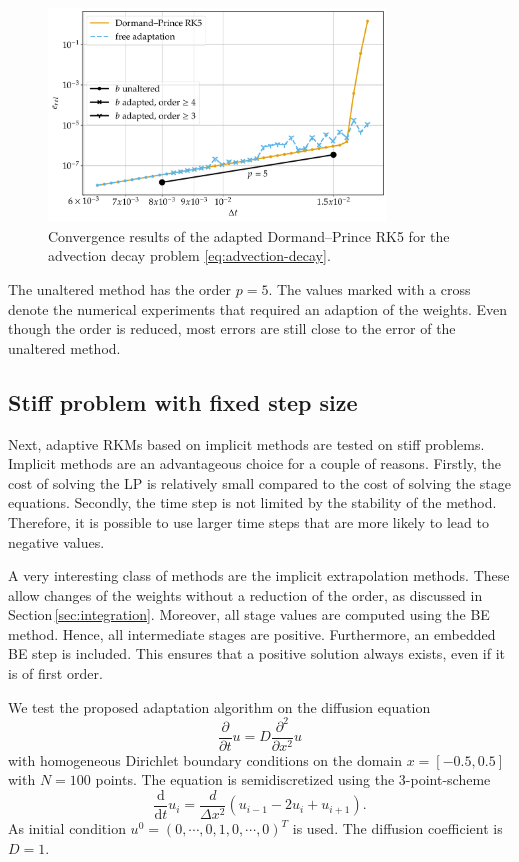 \documentclass[a4paper]{article}
\numberwithin{equation}{section}
\theoremstyle{plain}
\theoremstyle{definition}
\numberwithin{theorem}{section}
\newcommand{\1}{\mathbbm{1}}
\begin{document}
\begin{figure}[ht]
\centering
\includegraphics[width=0.8\textwidth]{plots/conv_adde.pdf}
\caption{Convergence results of the adapted Dormand--Prince RK5 for the advection decay problem \eqref{eq:advection-decay}.}
\label{fig:conv_expl}
\end{figure}

The unaltered method has the order $p=5$.
The values marked with a cross denote the numerical experiments that required an adaption of the weights.
Even though the order is reduced, most errors are still close to the error of the unaltered method.

\subsection{Stiff problem with fixed step size}
Next, adaptive RKMs based on implicit methods are tested on stiff problems.
Implicit methods are an advantageous choice for a couple of reasons.
Firstly, the cost of solving the LP is relatively small compared to the cost of solving the stage equations.
Secondly, the time step is not limited by the stability of the method.
Therefore, it is possible to use larger time steps that are more likely to lead to negative values.

A very interesting class of methods are the implicit extrapolation methods. These allow changes of the weights without a reduction of the order, as discussed in Section\,\ref{sec:integration}.
Moreover, all stage values are computed using the BE method. Hence, all intermediate stages are positive.
Furthermore, an embedded BE step is included. This ensures that a positive solution always exists, even if it is of first order.

We test the proposed adaptation algorithm on the diffusion equation
\begin{equation}
\label{eq:diffusion}
\frac{\partial }{\partial t} u = D \frac{\partial^2}{\partial x^2} u
\end{equation}
with homogeneous Dirichlet boundary conditions on the domain $x = [-0.5,0.5]$ with $N=100$ points. The equation is semidiscretized using the 3-point-scheme
\begin{equation}
\frac{\mathrm d}{\mathrm d t} u_i = \frac{d}{\Delta x^2} \left( u_{i-1} - 2u_i + u_{i+1} \right).
\end{equation}
As initial condition $u^0 = (0,\cdots,0,1,0,\cdots,0)^T$ is used. The diffusion coefficient is $D=1$.
\end{document}
